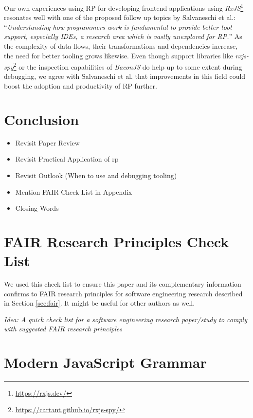 \documentclass[12pt,a4paper]{article}
\begin{document}
Our own experiences using RP for developing frontend applications using \emph{RxJS}\footnote{\url{https://rxjs.dev/}} resonates well with one of the proposed follow up topics by Salvaneschi et al.: ``\emph{Understanding how programmers work is fundamental to provide better tool support, especially IDEs, a research area which is vastly unexplored for RP.}''\cite{7827078} As the complexity of data flows, their transformations and dependencies increase, the need for better tooling grows likewise. Even though support libraries like \emph{rxjs-spy}\footnote{\url{https://cartant.github.io/rxjs-spy/}} or the inspection capabilities of \emph{BaconJS} do help up to some extent during debugging, we agree with Salvaneschi et al. that improvements in this field could boost the adoption and productivity of RP further.

\section{Conclusion}
\begin{itemize}
	\item Revisit Paper Review
	\item Revisit Practical Application of rp
	\item Revisit Outlook (When to use and debugging tooling)
	\item Mention FAIR Check List in Appendix
	\item Closing Words
\end{itemize}

\appendix

\section{FAIR Research Principles Check List}

We used this check list to ensure this paper and its complementary information confirms to FAIR research principles for software engineering research described in Section \ref{sec:fair}. It might be useful for other authors as well.

\begin{framed}
	\noindent\emph{Idea: A quick check list for a software engineering research paper/study to comply with suggested FAIR research principles}
\end{framed}

\section{Modern JavaScript Grammar}
\label{sec:modern-javascript-grammar}
\end{document}
